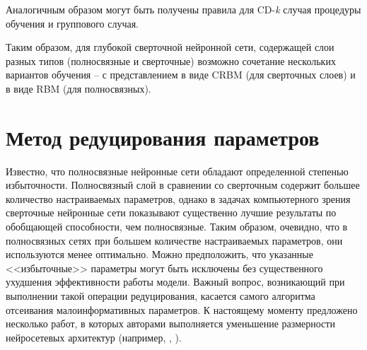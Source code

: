 Аналогичным образом могут быть получены правила для CD-\textit{k} случая процедуры обучения и группового случая.

Таким образом, для глубокой сверточной нейронной сети, содержащей слои разных типов (полносвязные и сверточные) возможно сочетание нескольких вариантов обучения -- с представлением в виде CRBM (для сверточных слоев) и в виде RBM (для полносвязных).  

\section{Метод редуцирования параметров}
Известно, что полносвязные нейронные сети обладают определенной степенью избыточности. Полносвязный слой в сравнении со сверточным содержит большее количество настраиваемых параметров, однако в задачах компьютерного зрения сверточные нейронные сети показывают существенно лучшие результаты по обобщающей способности, чем полносвязные. Таким образом, очевидно, что в полносвязных сетях при большем количестве настраиваемых параметров, они используются менее оптимально. Можно предположить, что указанные <<избыточные>> параметры могут быть исключены без существенного ухудшения эффективности работы модели. Важный вопрос, возникающий при выполнении такой операции редуцирования, касается самого алгоритма отсеивания малоинформативных параметров. К настоящему моменту предложено несколько работ, в которых авторами выполняется уменьшение размерности нейросетевых архитектур (например, \cite{mostafa2019parameter}, \cite{han2015learning}).


